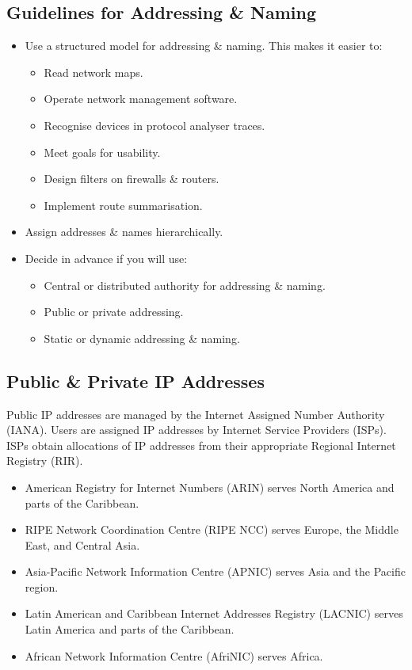 \documentclass[a4paper,11pt]{article}
\begin{document}
\subsection{Guidelines for Addressing \& Naming}
\begin{itemize}
    \item   Use a structured model for addressing \& naming.
            This makes it easier to:
            \begin{itemize}
                \item   Read network maps.
                \item   Operate network management software.
                \item   Recognise devices in protocol analyser traces.
                \item   Meet goals for usability.
                \item   Design filters on firewalls \& routers.
                \item   Implement route summarisation.
            \end{itemize}
    \item   Assign addresses \& names hierarchically.
    \item   Decide in advance if you will use:
            \begin{itemize}
                \item   Central or distributed authority for addressing \& naming.
                \item   Public or private addressing.
                \item   Static or dynamic addressing \& naming.
            \end{itemize}
\end{itemize}

\subsection{Public \& Private IP Addresses}
Public IP addresses are managed by the Internet Assigned Number Authority (IANA). 
Users are assigned IP addresses by Internet Service Providers (ISPs).
ISPs obtain allocations of IP addresses from their appropriate Regional Internet Registry (RIR).
\begin{itemize}
    \item   American Registry for Internet Numbers (ARIN) serves North America and parts of the Caribbean. 
    \item   RIPE Network Coordination Centre (RIPE NCC) serves Europe, the Middle East, and Central Asia. 
    \item   Asia-Pacific Network Information Centre (APNIC) serves Asia and the Pacific region. 
    \item   Latin American and Caribbean Internet Addresses Registry (LACNIC) serves Latin America and parts of the
            Caribbean. 
    \item   African Network Information Centre (AfriNIC) serves Africa. 
\end{itemize}
\end{document}
